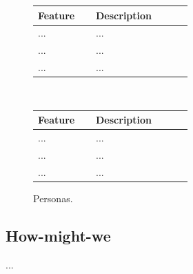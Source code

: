 \documentclass[../report.tex]{subfiles}
\begin{document}
\begin{figure}
\def\arraystretch{1.5}
\centering
\begin{tabular}{|p{0.3\linewidth}|p{0.5\linewidth}|}
\hline
Feature & Description \\
\hline
... & ... \\ 
... & ... \\ 
... & ... \\ 
\hline
\end{tabular}
\vspace{0.5cm} \\
\begin{tabular}{|p{0.3\linewidth}|p{0.5\linewidth}|}
\hline
Feature & Description \\
\hline
... & ... \\ 
... & ... \\ 
... & ... \\ 
\hline
\end{tabular}
\caption{Personas.}
\label{fig:personas}
\end{figure}

\subsection{How-might-we}

...
\end{document}
